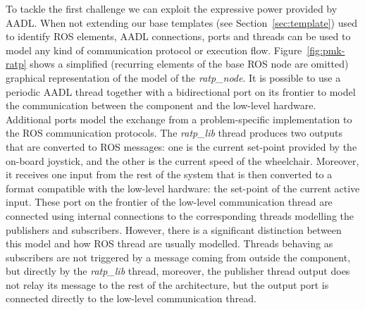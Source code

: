 To tackle the first challenge we can exploit the expressive power provided by AADL. When not extending our base templates (see Section~\ref{sec:template}) used to identify ROS elements,  AADL connections, ports and threads can be used to model any kind of communication protocol or execution flow. Figure~\ref{fig:pmk-ratp} shows a simplified (recurring elements of the base ROS node are omitted) graphical representation of the model of the \textit{ratp\_node}. It is possible to use a periodic AADL thread together with a bidirectional port on its frontier to model the communication between the component and the low-level hardware. Additional ports model the exchange from a problem-specific implementation to the ROS communication protocols.  The \textit{ratp\_lib} thread produces two outputs that are converted to ROS messages: one is the current set-point provided by the on-board joystick, and the other is the current speed of the wheelchair. Moreover, it receives one input from the rest of the system that is then converted to a format compatible with the low-level hardware: the set-point of the current active input. These port on the frontier of the low-level communication thread are connected using internal connections to the corresponding threads modelling the publishers and subscribers. However, there is a significant distinction between this model and how ROS thread are usually modelled. Threads behaving as subscribers are not triggered by a message coming from outside the component, but directly by the \textit{ratp\_lib} thread, moreover, the publisher thread output does not relay its message to the rest of the architecture, but the output port is connected directly to the low-level communication thread.

